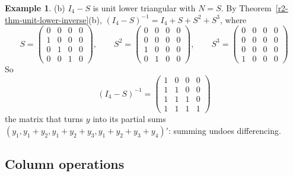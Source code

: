 \documentclass[12pt]{article}
\theoremstyle{definition}
\newtheorem{example}[theorem]{Example}
\begin{document}
\begin{example}
(b) \(I_4-S\) is unit lower triangular with \(N=S\). By Theorem~\ref{r2-thm-unit-lower-inverse}(b),
\((I_4-S)^{-1}=I_4+S+S^2+S^3\), where
\[
S=\begin{pmatrix}0&0&0&0\\1&0&0&0\\0&1&0&0\\0&0&1&0\end{pmatrix},\qquad
S^2=\begin{pmatrix}0&0&0&0\\0&0&0&0\\1&0&0&0\\0&1&0&0\end{pmatrix},\qquad
S^3=\begin{pmatrix}0&0&0&0\\0&0&0&0\\0&0&0&0\\1&0&0&0\end{pmatrix}
\]
So
\[
(I_4-S)^{-1}=\begin{pmatrix}1&0&0&0\\1&1&0&0\\1&1&1&0\\1&1&1&1\end{pmatrix}
\]
the matrix that turns \(y\) into its partial sums \((y_1,y_1+y_2,y_1+y_2+y_3,y_1+y_2+y_3+y_4)'\): summing undoes
differencing.
\end{example}

\subsection*{Column operations}
\end{document}
